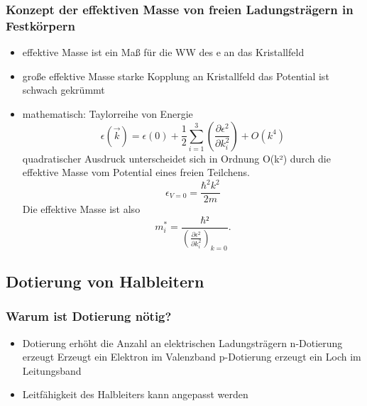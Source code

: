 \subsubsection*{Konzept der effektiven Masse von freien Ladungsträgern in Festkörpern}
\begin{itemize}
\item effektive Masse ist ein Maß für die WW des e an das Kristallfeld
\item große effektive Masse \iff starke Kopplung an Kristallfeld \to das Potential ist schwach gekrümmt
\item mathematisch: 
    Taylorreihe von Energie
    \begin{equation*}
        \epsilon(\vec{k})=\epsilon(0)+\frac{1}{2}\sum_{i=1}^3\left(\frac{\partial \epsilon^2}{\partial k_i^2}\right)+O(k^4)
    \end{equation*}
    quadratischer Ausdruck unterscheidet sich in Ordnung O(k²) durch die effektive Masse
    vom Potential eines freien Teilchens.
    \begin{equation*}
        \epsilon_{V=0}=\frac{\hbar^2 k^2}{2m}
    \end{equation*}
    Die effektive Masse ist also 
    \begin{equation*}
        m_i^*=\frac{\hbar²}{\left(\frac{\partial \epsilon^2}{\partial k_i^2}\right)_{k=0}}.
    \end{equation*}
\end{itemize}

\subsection{Dotierung von Halbleitern}
\subsubsection*{Warum ist Dotierung nötig?}
\begin{itemize}
    \item Dotierung erhöht die Anzahl an elektrischen Ladungsträgern
        \to n-Dotierung erzeugt Erzeugt ein Elektron im Valenzband 
        \to p-Dotierung erzeugt ein Loch im Leitungsband 
    \item Leitfähigkeit des Halbleiters kann angepasst werden
\end{itemize}

